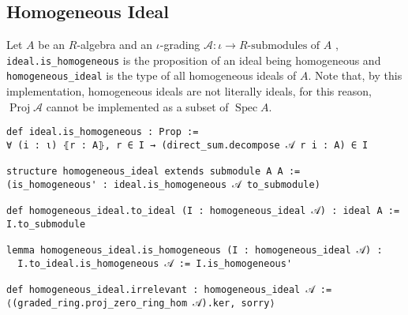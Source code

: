 \documentclass[a4paper,UKenglish,cleveref, autoref, thm-restate]{lipics-v2021}
\begin{document}
\subsection{Homogeneous Ideal}
Let $A$ be an $R$-algebra and an $\iota$-grading $\mathcal{A} : \iota\to R\text{-submodules of~} A$ \cite{wieser2022graded}, \lstinline{ideal.is_homogeneous} is the proposition of an ideal being homogeneous and \lstinline{homogeneous_ideal} is the type of all homogeneous ideals of $A$. Note that, by this implementation, homogeneous ideals are not literally ideals, for this reason, $\operatorname{Proj} \mathcal{A}$ cannot be implemented as a subset of $\operatorname{Spec} A$.
\begin{lstlisting}
def ideal.is_homogeneous : Prop :=
∀ (i : ι) ⦃r : A⦄, r ∈ I → (direct_sum.decompose 𝒜 r i : A) ∈ I

structure homogeneous_ideal extends submodule A A :=
(is_homogeneous' : ideal.is_homogeneous 𝒜 to_submodule)

def homogeneous_ideal.to_ideal (I : homogeneous_ideal 𝒜) : ideal A := I.to_submodule

lemma homogeneous_ideal.is_homogeneous (I : homogeneous_ideal 𝒜) :
  I.to_ideal.is_homogeneous 𝒜 := I.is_homogeneous'

def homogeneous_ideal.irrelevant : homogeneous_ideal 𝒜 :=
⟨(graded_ring.proj_zero_ring_hom 𝒜).ker, sorry⟩
\end{lstlisting}
\end{document}

